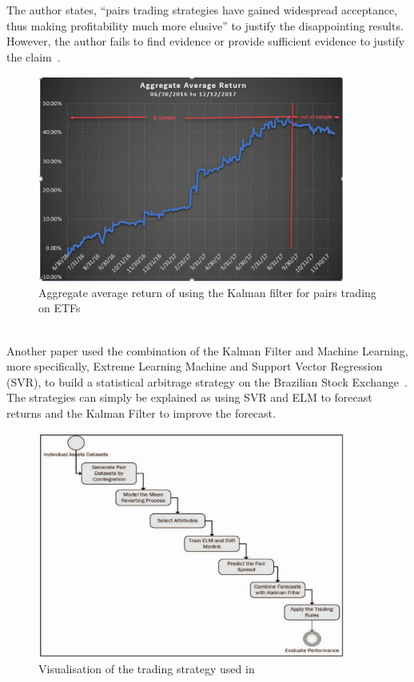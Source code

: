 \noindent The author states, ``pairs trading strategies have gained widespread acceptance, thus making profitability much more elusive'' to justify the disappointing results. However, the author fails to find evidence or provide sufficient evidence to justify the claim~\cite{dempsey_market_2017}.
\begin{figure}[htb!]
    \centering
    \includegraphics[width=0.9\textwidth]{background/Images/insamplevsoutsampleresults.png}
    \caption{Aggregate average return of using the Kalman filter for pairs trading on ETFs~\cite{dempsey_market_2017}}
    \label{fig:kalman_results}
\end{figure}
\\[3mm]
Another paper used the combination of the Kalman Filter and Machine Learning, more specifically, Extreme Learning Machine and Support Vector Regression (SVR), to build a statistical arbitrage strategy on the Brazilian Stock Exchange~\cite{6974093}. The strategies can simply be explained as using SVR and ELM to forecast returns and the Kalman Filter to improve the forecast.
\begin{figure}[htb!]
    \centering
    \includegraphics[width=0.9\textwidth]{background/Images/KalmanMLFlowChart.png}
    \caption{Visualisation of the trading strategy used in \cite{6974093}}
    \label{fig:kalman_ml_flowchart}
\end{figure}
